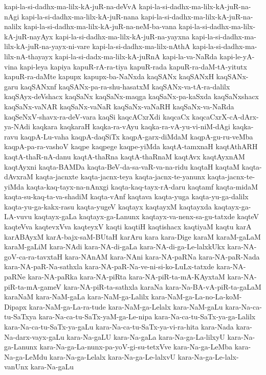 {kapi-la-si-dadhx-ma-lilx-kA-juR-na-deVvA
kapi-la-si-dadhx-ma-lilx-kA-juR-na-nAgi
kapi-la-si-dadhx-ma-lilx-kA-juR-nana
kapi-la-si-dadhx-ma-lilx-kA-juR-na-nalilx
kapi-la-si-dadhx-ma-lilx-kA-juR-na-neM-ba-vana
kapi-la-si-dadhx-ma-lilx-kA-juR-nayAyx
kapi-la-si-dadhx-ma-lilx-kA-juR-na-yayxna
kapi-la-si-dadhx-ma-lilx-kA-juR-na-yayx-ni-vare
kapi-la-si-dadhx-ma-lilx-nAthA
kapi-la-si-dadhx-ma-lilx-nA-thayayx
kapi-la-si-dadx-ma-lilx-kA-juRnA
kapi-la-va-NaRda
kapi-le-yA-vina
kapi-leya
kapiya
kapuR-rA-ra-tiya
kapuR-rada
kapuR-ra-daM-tA-yitutx
kapuR-ra-daMte
kapupx
kapupx-ba-NaNxda
kaqSANx
kaqSANxH
kaqSANx-garu
kaqSANxnf
kaqSANx-pa-ra-shu-hasatxM
kaqSANx-va-tA-ra-dalilx
kaqSAyx-deVshacx
kaqSaNx
kaqSaNx-maqga
kaqSaNx-pa-kaSxda
kaqSaNxshacx
kaqSaNx-vaNAR
kaqSaNx-vaNaR
kaqSaNx-vaNaRH
kaqSaNx-va-NaRda
kaqSeNxV-shavx-ra-deV-vara
kaqSi
kaqcACxrXdi
kaqcaCx
kaqcaCxrX-cA-dArx-ya-NAdi
kaqkara
kaqkaraH
kaqka-ra-vAyu
kaqka-ra-vA-yu-vi-niM-dAgi
kaqka-ravu
kaqpA-Lu-vaha
kaqpA-daqSiTx
kaqpA-garx-diMdaM
kaqpA-gu-ru-veMba
kaqpA-pa-ra-vashoV
kaqpe
kaqpege
kaqpe-yiMda
kaqtA-tamxnaH
kaqtAthARH
kaqtA-thaR-nA-danu
kaqtA-thaRna
kaqtA-thaRnaM
kaqtAvx
kaqtAyxnAM
kaqtAyxni
kaqta-BAMDa
kaqta-BeV-da-sa-vaR-va-na-ridu
kaqtaH
kaqtaM
kaqta-dAvxraM
kaqta-jacnxte
kaqta-jacnx-teya
kaqta-jacnx-te-yanunx
kaqta-jacnx-te-yiMda
kaqta-kaq-tayx-na-nAnxgi
kaqta-kaq-tayx-rA-daru
kaqtamf
kaqta-midaM
kaqta-su-kaq-ta-va-shadiM
kaqta-vAnf
kaqtava
kaqta-yuga
kaqta-yu-ga-dalilx
kaqta-yu-ga-kakx-rasu
kaqta-yugeV
kaqtayx
kaqtayxM
kaqtayxda
kaqtayx-ga-LA-vuvu
kaqtayx-gaLa
kaqtayx-ga-Lanunx
kaqtayx-va-nenx-sa-gu-tatxde
kaqteV
kaqteVva
kaqtevxVva
kaqteyxV
kaqti
kaqtiH
kaqtishacx
kaqtiyaM
kaqtu
karA
karABAyxM
karA-bajx-saM-BUtaH
karAru
kara
kara-Dige
karaM
karaM-gaLaM
karaM-gaLiM
kara-NAdi
kara-NA-di-gaLa
kara-NA-di-ga-Le-lalxkUkx
kara-NA-goV-ca-ra-tavxtaH
kara-NAnAM
kara-NAni
kara-NA-paRNa
kara-NA-paR-Nada
kara-NA-paR-Na-sathxla
kara-NA-paR-Na-ve-ni-si-ko-LuLx-tatxde
kara-NA-paRNe
kara-NA-paRka
kara-NA-piRta
kara-NA-piR-ta-mA-KAyxtaM
kara-NA-piR-ta-mA-gameV
kara-NA-piR-ta-sathxla
karaNa
kara-Na-BA-vA-piR-ta-gaLaM
karaNaM
kara-NaM-gaLa
kara-NaM-ga-Lalilx
kara-NaM-ga-La-no-La-koM-Dipapx
kara-NaM-ga-La-ra-tude
kara-NaM-ga-Lelalx
kara-NaM-gaLu
kara-Na-ca-tu-SaTxya
kara-Na-ca-tu-SaTx-yaM-ga-Le-nipa
kara-Na-ca-tu-SaTx-ya-ga-Lalilx
kara-Na-ca-tu-SaTx-ya-gaLu
kara-Na-ca-tu-SaTx-ya-vi-ra-hita
kara-Nada
kara-Na-darx-vayx-gaLu
kara-Na-gaLU
kara-Na-gaLa
kara-Na-ga-La-lilxyU
kara-Na-ga-Lanunx
kara-Na-ga-La-nunx-pa-yoV-gi-su-tetxVve
kara-Na-ga-LeMba
kara-Na-ga-LeMdu
kara-Na-ga-Lelalx
kara-Na-ga-Le-lalxvU
kara-Na-ga-Le-lalx-vanUnx
kara-Na-gaLu
}
